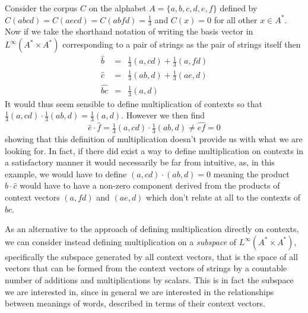 Consider the corpus $C$ on the alphabet $A = \{a,b,c,d,e,f\}$ defined by $C(abcd) = C(aecd) = C(abfd) = \frac{1}{3}$ and $C(x) = 0$ for all other $x \in A^*$. Now if we take the shorthand notation of writing the basis vector in $L^\infty(A^*\times A^*)$ corresponding to a pair of strings as the pair of strings itself then
\begin{eqnarray*}
\hat{b} &=& \tfrac{1}{3}(a,cd) +  \tfrac{1}{3}(a,fd)\\
\hat{c} &=& \tfrac{1}{3}(ab,d) +  \tfrac{1}{3}(ae,d)\\
\widehat{bc} &=& \tfrac{1}{3}(a,d)
\end{eqnarray*}
%
%
It would thus seem sensible to define multiplication of contexts so that $ \tfrac{1}{3}(a,cd)\cdot  \tfrac{1}{3}(ab,d) =  \tfrac{1}{3}(a,d)$. However we then find
$$\hat{e}\cdot \hat{f} =  \tfrac{1}{3}(a,cd)\cdot  \tfrac{1}{3}(ab,d) \neq \widehat{ef} = 0$$
showing that this definition of multiplication doesn't provide us with what we are looking for. In fact, if there did exist a way to define multiplication on contexts in a satisfactory manner it would necessarily be far from intuitive, as, in this example, we would have to define $(a,cd)\cdot (ab,d) = 0$ meaning the product $\hat{b}\cdot\hat{c}$ would have to have a non-zero component derived from the products of context vectors $(a,fd)$ and $(ae,d)$ which don't relate at all to the contexts of $bc$.




As an alternative to the approach of defining multiplication directly on contexts, we can consider instead defining multiplication on a \emph{subspace} of $L^\infty(A^*\times A^*)$, specifically the subspace generated by all context vectors, that is the space of all vectors that can be formed from the context vectors of strings by a countable number of additions and multiplications by scalars. This is in fact the subspace we are interested in, since in general we are interested in the relationships between meanings of words, described in terms of their context vectors.

